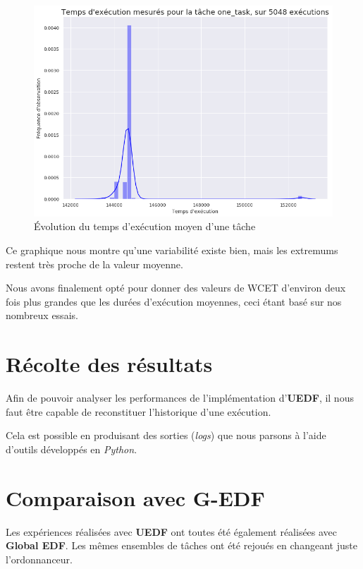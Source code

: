 \begin{figure}[H]
	\label{evotask}
	\caption{Évolution du temps d'exécution moyen d'une tâche}
	\includegraphics[scale=0.5]{img/wcet/one_task_hist}
\end{figure}

Ce graphique nous montre qu'une variabilité existe bien, mais les extremums restent très proche de la valeur moyenne.

Nous avons finalement opté pour donner des valeurs de WCET d'environ deux fois plus grandes que les durées 
d'exécution moyennes, ceci étant basé sur nos nombreux essais. 

	
\section{Récolte des résultats}
	Afin de pouvoir analyser les performances de l'implémentation d'\textbf{UEDF}, il nous faut être capable de reconstituer 
	l'historique d'une exécution. \newline
	
	Cela est possible en produisant des sorties (\textit{logs}) que nous parsons à l'aide d'outils 
	développés en \textit{Python}. 
	

\section{Comparaison avec G-EDF}

	Les expériences réalisées avec \textbf{UEDF }ont toutes été également réalisées avec \textbf{Global EDF}.
	Les mêmes ensembles de tâches ont été rejoués en changeant juste l'ordonnanceur. 
	
